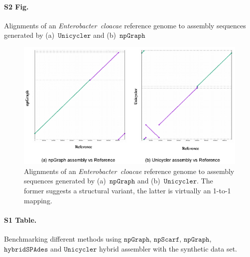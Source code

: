 \documentclass[10pt,letterpaper]{article}
\newcommand{\npscarf}{$\mathtt{npScarf}$}
\newcommand{\npgraph}{$\mathtt{npGraph}$}
\newcommand{\lrscaf}{$\mathtt{npGraph}$}
\newcommand{\unicycler}{$\mathtt{Unicycler}$}
\begin{document}
\paragraph*{S2 Fig.}
\label{S2_Fig} Alignments of an \emph{Enterobacter~cloacae} reference genome to assembly sequences generated by  (a)~\unicycler{} and (b)~\npgraph{}

\begin{figure}[!ht]
 \includegraphics[width=\textwidth]{images/FigS2.eps}
 \caption{Alignments of an \emph{Enterobacter~cloacae} reference genome to assembly sequences generated by  (a)~\npgraph{} and (b)~\unicycler{}. The former suggests a structural variant, the latter is virtually an 1-to-1 mapping.}
\end{figure}

\clearpage
\paragraph*{S1 Table.}
\label{S1_Table}
Benchmarking different methods using \lrscaf{}, \npscarf{}, \npgraph{}, $\mathtt{hybridSPAdes}$ and \unicycler{} hybrid assembler with the synthetic data set.

\makeatletter

\newlength\oriarrayrulewidth  
\newcount\orilowpenalty
\newcommand\nobreakmidrule{%
 \noalign{\global\oriarrayrulewidth\arrayrulewidth\relax
          \global\orilowpenalty\@lowpenalty\relax  
          \global\@lowpenalty=\numexpr-10000\relax%
          \global\arrayrulewidth\lightrulewidth\relax}
 \hline
 \noalign{\global\@lowpenalty=\orilowpenalty\relax%
          \global\arrayrulewidth\oriarrayrulewidth\relax}}

\makeatother
\setlength{\LTleft}{-1in}
\setcounter{table}{0}  
\end{document}

